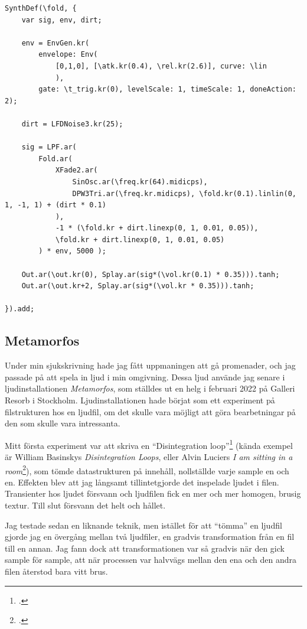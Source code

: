 \documentclass{article}
\renewcommand{\baselinestretch}{1.5}
\begin{document}
\pagebreak
\renewcommand{\baselinestretch}{1}
\begin{lstlisting}[style=SuperCollider-IDE, caption=Fold-SynthDef från K87-89]
SynthDef(\fold, {
	var sig, env, dirt;

	env = EnvGen.kr(
		envelope: Env(
			[0,1,0], [\atk.kr(0.4), \rel.kr(2.6)], curve: \lin
			), 
		gate: \t_trig.kr(0), levelScale: 1, timeScale: 1, doneAction: 2);

	dirt = LFDNoise3.kr(25);

	sig = LPF.ar( 
		Fold.ar(
			XFade2.ar(
				SinOsc.ar(\freq.kr(64).midicps), 
				DPW3Tri.ar(\freq.kr.midicps), \fold.kr(0.1).linlin(0, 1, -1, 1) + (dirt * 0.1)
			),
			-1 * (\fold.kr + dirt.linexp(0, 1, 0.01, 0.05)),
			\fold.kr + dirt.linexp(0, 1, 0.01, 0.05)
		) * env, 5000 );

	Out.ar(\out.kr(0), Splay.ar(sig*(\vol.kr(0.1) * 0.35))).tanh;
	Out.ar(\out.kr+2, Splay.ar(sig*(\vol.kr * 0.35))).tanh;

}).add;
\end{lstlisting}
\renewcommand{\baselinestretch}{1.5}

\subsection{Metamorfos}
Under min sjukskrivning hade jag fått uppmaningen att gå promenader, och jag passade på att spela in ljud i
min omgivning. Dessa ljud använde jag senare i ljudinstallationen \emph{Metamorfos}, som ställdes ut en helg i
februari 2022 på Galleri Resorb i Stockholm. Ljudinstallationen hade börjat som ett experiment på
filstrukturen hos en ljudfil, om det skulle vara möjligt att göra bearbetningar på den som skulle vara
intressanta. 

Mitt första experiment var att skriva en ``Disintegration loop''\footcite{Basinski} (kända
exempel är William Basinskys \emph{Disintegration Loops}, eller Alvin Luciers \emph{I am sitting in a
room}\footcite{Lucier}), som tömde datastrukturen på innehåll, nollställde varje sample en och en. Effekten
blev att jag långsamt tillintetgjorde det inspelade ljudet i filen. Transienter hos ljudet försvann och
ljudfilen fick en mer och mer homogen, brusig textur. Till slut försvann det helt och hållet.

Jag testade sedan en liknande teknik, men istället för att ``tömma'' en ljudfil gjorde jag en övergång
mellan två ljudfiler, en gradvis transformation från en fil till en annan. Jag fann dock att
transformationen var så gradvis när den gick sample för sample, att när processen var halvvägs mellan den ena
och den andra filen återstod bara vitt brus. 
\end{document}
